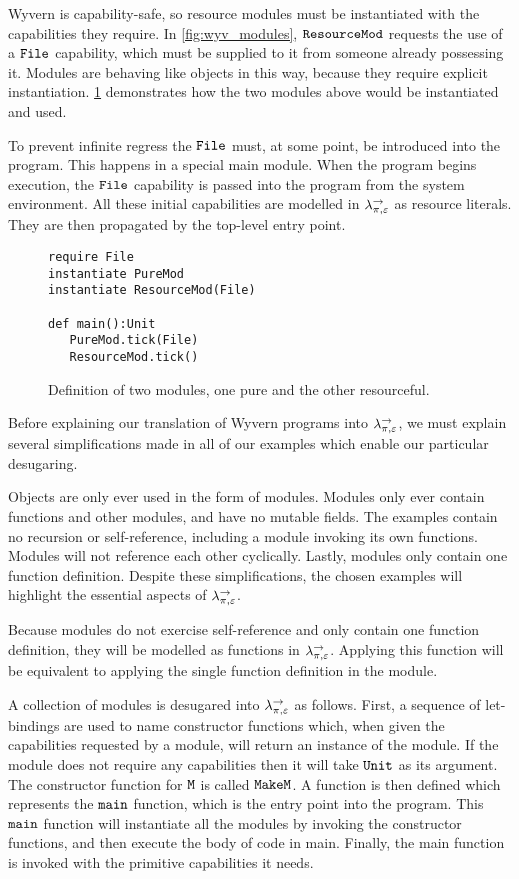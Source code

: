 Wyvern is capability-safe, so resource modules must be instantiated with the capabilities they require. In \ref{fig:wyv_modules}, $\mathtt{ResourceMod}$ requests the use of a $\mathtt{File}$ capability, which must be supplied to it from someone already possessing it. Modules are behaving like objects in this way, because they require explicit instantiation. \ref{fig:wyv_module_instantiation} demonstrates how the two modules above would be instantiated and used.

To prevent infinite regress the $\mathtt{File}$ must, at some point, be introduced into the program. This happens in a special main module. When the program begins execution, the $\mathtt{File}$ capability is passed into the program from the system environment. All these initial capabilities are modelled in $\lambda^{\rightarrow}_{\pi, \varepsilon}$ as resource literals. They are then propagated by the top-level entry point.

\begin{figure}[h]

\begin{lstlisting}
require File
instantiate PureMod
instantiate ResourceMod(File)

def main():Unit
   PureMod.tick(File)
   ResourceMod.tick()
\end{lstlisting}

\caption{Definition of two modules, one pure and the other resourceful.}
\label{fig:wyv_module_instantiation}
\end{figure}

Before explaining our translation of Wyvern programs into $\lambda^{\rightarrow}_{\pi, \varepsilon}$, we must explain several simplifications made in all of our examples which enable our particular desugaring.

Objects are only ever used in the form of modules. Modules only ever contain functions and other modules, and have no mutable fields. The examples contain no recursion or self-reference, including a module invoking its own functions. Modules will not reference each other cyclically. Lastly, modules only contain one function definition. Despite these simplifications, the chosen examples will highlight the essential aspects of $\lambda^{\rightarrow}_{\pi, \varepsilon}$.

Because modules do not exercise self-reference and only contain one function definition, they will be modelled as functions in $\lambda^{\rightarrow}_{\pi, \varepsilon}$. Applying this function will be equivalent to applying the single function definition in the module.

A collection of modules is desugared into $\lambda^{\rightarrow}_{\pi, \varepsilon}$ as follows. First, a sequence of let-bindings are used to name constructor functions which, when given the capabilities requested by a module, will return an instance of the module. If the module does not require any capabilities then it will take $\mathtt{Unit}$ as its argument. The constructor function for $\mathtt{M}$ is called $\mathtt{MakeM}$. A function is then defined which represents the $\mathtt{main}$ function, which is the entry point into the program. This $\mathtt{main}$ function will instantiate all the modules by invoking the constructor functions, and then execute the body of code in main. Finally, the main function is invoked with the primitive capabilities it needs.

